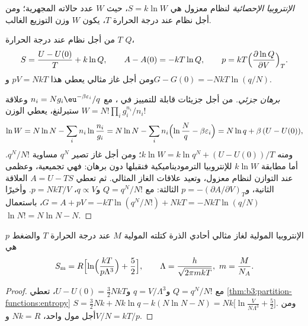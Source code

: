 \begin{definition}\label{def:b3:partition-functions:statistical-entropy}
\emph{الإنتروبيا الإحصائية} لنظام معزول هي
$S = k\ln W$، حيث $W$ عدد حالاته المجهرية؛ ومن أجل نظام عند
درجة الحرارة $T$، يكون $W$ وزن التوزيع الغالب.
\end{definition}

\begin{theorem}\label{thm:b3:partition-functions:entropy}
من أجل نظام عند درجة الحرارة $T$  $Q$،
\[
  S = \frac{U - U(0)}{T} + k\ln Q, \qquad A - A(0) = -kT\ln Q, \qquad
  p = kT\Bigl(\frac{\partial\ln Q}{\partial V}\Bigr)_T .
\]
ومن أجل غاز مثالي يعطي هذا $pV = NkT$ و$G - G(0) = -NkT\ln(q/N)$.
\end{theorem}

\begin{proof}[برهان جزئي]
من أجل جزيئات قابلة للتمييز في ، مع $n_i = Ng_i\eu^{-\beta\varepsilon_i}/q$
وعلاقة ستيرلنغ، يعطي الوزن $W = N!\prod_ig_i^{n_i}/n_i!$
\[
  \ln W = N\ln N - \sum_in_i\ln\frac{n_i}{g_i} = N\ln N - \sum_in_i\Bigl(\ln\frac Nq - \beta\varepsilon_i\Bigr)
        = N\ln q + \beta\,(U - U(0)),
\]
ومنه $k\ln W = k\ln q^N + (U - U(0))/T$؛ ومن أجل غاز تصير $q^N$ مساوية $q^N/N!$. أما
مطابقة $k\ln W$ للإنتروبيا الترموديناميكية فنقبلها دون برهان: فهي
تجميعية، وعظمى عند التوازن لنظام معزول، وتعيد علاقات
الغاز المثالي. ثم تعطي $A = U - TS$ العلاقة الثانية، و$p =
-(\partial A/\partial V)_T$ الثالثة: مع $Q = q^N/N!$ و$q \propto V$، $p = NkT/V$. وأخيرًا
$G = A + pV = -kT\ln(q^N/N!) + NkT = -NkT\ln(q/N)$، باستعمال $\ln N! = N\ln N - N$.
\end{proof}

\begin{theorem}\label{thm:b3:partition-functions:sackur-tetrode}
الإنتروبيا المولية لغاز مثالي أحادي الذرة كتلته المولية $M$ عند درجة الحرارة $T$
والضغط $p$ هي
\[
  S_{\mathrm m} = R\Bigl[\ln\Bigl(\frac{kT}{p\Lambda^3}\Bigr) + \frac52\Bigr],
  \qquad \Lambda = \frac{h}{\sqrt{2\pi mkT}},\ m = \frac{M}{N_A}.
\]
\end{theorem}

\begin{proof}
مع $Q = q^N/N!$ و$q = V/\Lambda^3$ و$U - U(0) = \frac32NkT$،
تعطي \cref{thm:b3:partition-functions:entropy} $S = \frac32Nk + Nk\ln q - k(N\ln N - N) =
Nk\bigl[\ln\frac{V}{N\Lambda^3} + \frac52\bigr]$. ومن أجل مول واحد، $Nk = R$ و$V/N = kT/p$.
\end{proof}

